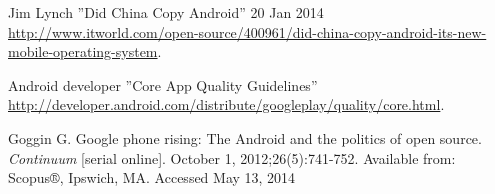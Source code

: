 \documentclass[conference]{IEEEtran}
\begin{document}
\begin{thebibliography}{1}
Jim Lynch ''Did China Copy Android''  20 Jan 2014 \url{http://www.itworld.com/open-source/400961/did-china-copy-android-its-new-mobile-operating-system}.

Android developer ''Core App Quality Guidelines''
\url{http://developer.android.com/distribute/googleplay/quality/core.html}.

Goggin G. Google phone rising: The Android and the politics of open source. \textit{Continuum} [serial online]. October 1, 2012;26(5):741-752. Available from: Scopus®, Ipswich, MA. Accessed May 13, 2014

\end{thebibliography}
\end{document}
